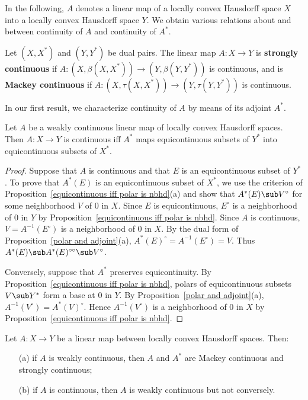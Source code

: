 In the following, $A$ denotes a linear map of a locally convex Hausdorff space $X$ into a locally convex Hausdorff space $Y$. We obtain various relations about and between continuity of $A$ and continuity of $A^*$.
\begin{definition}
Let $(X, X^*)$ and $(Y,Y^*)$ be dual pairs. The linear map $A:X\to Y$ is \textbf{strongly continuous} if $A:(X,\beta(X,X^*))\to(Y,\beta(Y,Y^*))$ is continuous, and is \textbf{Mackey continuous} if $A:(X,\tau(X,X^*))\to(Y,\tau(Y,Y^*))$ is continuous.
\end{definition}
In our first result, we characterize continuity of $A$ by means of its adjoint $A^*$.
\begin{proposition}\label{LCHS weak continuous is continuous iff}
Let $A$ be a weakly continuous linear map of locally convex Hausdorff spaces. Then $A:X\to Y$ is continuous iff $A^*$ maps equicontinuous subsets of $Y^*$ into equicontinuous subsets of $X^*$.
\end{proposition}
\begin{proof}
Suppose that $A$ is continuous and that $E$ is an equicontinuous subset of $Y^*$. To prove that $A^*(E)$ is an equicontinuous subset of $X^*$, we use the criterion of Proposition~\ref{equicontinuous iff polar is nbhd}(a) and show that $A^*(E)\sub V^\circ$ for some neighborhood $V$ of $0$ in $X$. Since $E$ is equicontinuous, $E^\circ$ is a neighborhood of $0$ in $Y$ by Proposition~\ref{equicontinuous iff polar is nbhd}. Since $A$ is continuous, $V=A^{-1}(E^\circ)$ is a neighborhood of $0$ in $X$. By the dual form of Proposition~\ref{polar and adjoint}(a), $A^*(E)^\circ=A^{-1}(E^\circ)=V$. Thus $A^*(E)\sub A^*(E)^{\circ\circ}\sub V^\circ$.\par
Conversely, suppose that $A^*$ preserves equicontinuity. By Proposition~\ref{equicontinuous iff polar is nbhd}, polars of equicontinuous subsets $V\sub Y^*$ form a base at $0$ in $Y$. By Proposition~\ref{polar and adjoint}(a), $A^{-1}(V^\circ)=A^*(V)^\circ$. Hence $A^{-1}(V^\circ)$ is a neighborhood of $0$ in $X$ by Proposition~\ref{equicontinuous iff polar is nbhd}.
\end{proof}
\begin{theorem}\label{LCHS continuous and weak continuous}
Let $A:X\to Y$ be a linear map between locally convex Hausdorff spaces. Then:
\begin{itemize}
\item[(a)] if $A$ is weakly continuous, then $A$ and $A^*$ are Mackey continuous and strongly continuous;
\item[(b)] if $A$ is continuous, then $A$ is weakly continuous but not conversely.
\end{itemize}
\end{theorem}
